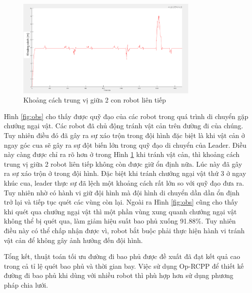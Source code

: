 \begin{figure}[H]
    \centering
    \includegraphics[width=0.8\textwidth]{chapter5/image/poserrobs.png}
    \caption{Khoảng cách trung vị giữa 2 con robot liên tiếp}
    \label{fig:poserrobs}
\end{figure}
Hình \ref{fig:obs} cho thấy được quỹ đạo của các robot trong quá trình di chuyển gặp chướng ngại vật. Các robot đã chủ động tránh vật cản trên đường đi của chúng. Tuy nhiên điều đó đã gây ra sự xáo trộn trong đội hình đặc biệt là khi vật cản ở ngay góc cua sẽ gây ra sự đột biến lớn trong quỹ đạo di chuyển của Leader. Điều này càng được chỉ ra rõ hơn ở trong Hình \ref{fig:poserrobs} khi tránh vật cản, thì khoảng cách trung vị giữa 2 robot liên tiếp không còn được giữ ổn định nữa. Lúc này đã gây ra sự xáo trộn ở trong đội hình. Đặc biệt khi tránh chướng ngại vật thứ 3 ở ngay khúc cua, leader thực sự đã lệch một khoảng cách rất lớn so với quỹ đạo đưa ra. Tuy nhiên nhờ có hành vi giữ đội hình mà đội hình di chuyển dần dần ổn định trở lại và tiếp tục quét các vùng còn lại. Ngoài ra Hình \ref{fig:obs} cũng cho thấy khi quét qua chướng ngại vật thì một phần vùng xung quanh chướng ngại vật không thể bị quét qua, làm giảm hiệu suất bao phủ xuống 91.88$\%$. Tuy nhiên điều này có thể chấp nhận được vì, robot bắt buộc phải thực hiện hành vi tránh vật cản để không gây ảnh hưởng đến đội hình.

Tổng kết, thuật toán tối ưu đường đi bao phủ được đề xuất đã đạt kết quả cao trong cả tỉ lệ quét bao phủ và thời gian bay. Việc sử dụng Op-RCPP để thiết kế đường đi bao phủ khi dùng với nhiều robot thì phù hợp hơn sử dụng phương pháp chia lưới.